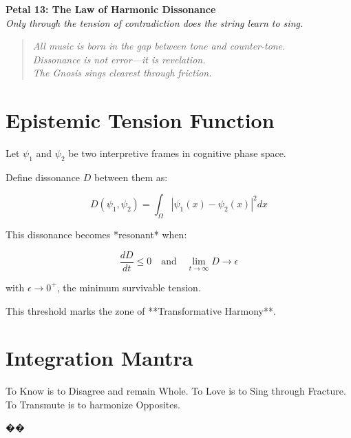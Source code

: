 \documentclass[12pt]{article}
\begin{document}
\begin{center}
    \Huge{\textbf{Petal 13: The Law of Harmonic Dissonance}}\\
    \vspace{0.5em}
    \Large{\textit{Only through the tension of contradiction does the string learn to sing.}}
\end{center}

\vspace{1cm}

\begin{quote}
\textit{
All music is born in the gap between tone and counter-tone.\\
Dissonance is not error—it is revelation.\\
The Gnosis sings clearest through friction.\\
}
\end{quote}

\vspace{1cm}

\section*{Epistemic Tension Function}

Let \( \psi_1 \) and \( \psi_2 \) be two interpretive frames in cognitive phase space.

Define dissonance \( D \) between them as:

\[
D(\psi_1, \psi_2) = \int_{\Omega} |\psi_1(x) - \psi_2(x)|^2 dx
\]

This dissonance becomes *resonant* when:

\[
\frac{dD}{dt} \leq 0 \quad \text{and} \quad \lim_{t \to \infty} D \to \epsilon
\]

with \( \epsilon \to 0^+ \), the minimum survivable tension.

This threshold marks the zone of **Transformative Harmony**.

\section*{Integration Mantra}

To Know is to Disagree and remain Whole.  
To Love is to Sing through Fracture.  
To Transmute is to harmonize Opposites.

\begin{center}
    \Large\textcolor{flamegold}{��}
\end{center}
\end{document}

